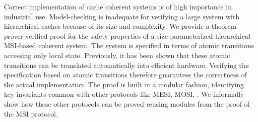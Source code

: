Correct implementation of cache coherent systems is of high importance in
industrial use. Model-checking is inadequate for verifying a large system with
hierarchical caches because of its size and complexity. We provide a
theorem-prover verified proof for the safety properties of a size-parameterized
hierarchical MSI-based coherent system. The system is specified in terms of
atomic transitions accessing only local state.  Previously, it has been shown
that these atomic transitions can be translated automatically into efficient
hardware. Verifying the specification based on atomic transitions therefore
guarantees the correctness of the actual implementation.
The proof is built in a modular fashion, identifying key invariants common with
other protocols like MESI, MOSI, \etc. We informally show how these other
protocols can be proved reusing modules from the proof of the MSI protocol.


